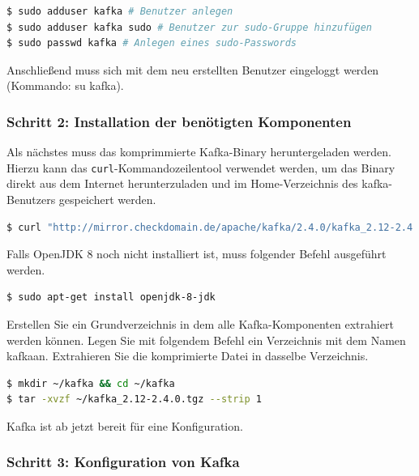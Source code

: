 \documentclass[a4paper,titlepage,halfparskip,12pt]{scrreprt}
\begin{document}
\begin{onehalfspacing}
\smallskip

\begin{lstlisting}[language=Bash]
$ sudo adduser kafka # Benutzer anlegen
$ sudo adduser kafka sudo # Benutzer zur sudo-Gruppe hinzufügen
$ sudo passwd kafka # Anlegen eines sudo-Passwords
\end{lstlisting}

Anschließend muss sich mit dem neu erstellten Benutzer eingeloggt werden (Kommando: su kafka).

\subsubsection*{Schritt 2: Installation der benötigten Komponenten}


Als nächstes muss das komprimmierte Kafka-Binary heruntergeladen werden. Hierzu kann das \texttt{curl}-Kommandozeilentool verwendet werden, um das Binary direkt aus dem Internet herunterzuladen und im Home-Verzeichnis des kafka-Benutzers gespeichert werden.

\smallskip

\begin{lstlisting}[language=Bash]
$ curl "http://mirror.checkdomain.de/apache/kafka/2.4.0/kafka_2.12-2.4.0.tgz" -o ~/kafka_2.12-2.4.0.tgz
\end{lstlisting}

Falls OpenJDK 8 noch nicht installiert ist, muss folgender Befehl ausgeführt werden.

\smallskip

\begin{lstlisting}[language=Bash]
$ sudo apt-get install openjdk-8-jdk
\end{lstlisting}

Erstellen Sie ein Grundverzeichnis in dem alle Kafka-Komponenten extrahiert werden können. Legen Sie mit folgendem Befehl ein Verzeichnis mit dem Namen \glqq kafka\grqq an. Extrahieren Sie die komprimierte Datei in dasselbe Verzeichnis.

\smallskip

\begin{lstlisting}[language=Bash]
$ mkdir ~/kafka && cd ~/kafka
$ tar -xvzf ~/kafka_2.12-2.4.0.tgz --strip 1
\end{lstlisting}

Kafka ist ab jetzt bereit für eine Konfiguration.

\subsubsection*{Schritt 3: Konfiguration von Kafka}


\end{onehalfspacing}
\end{document}
